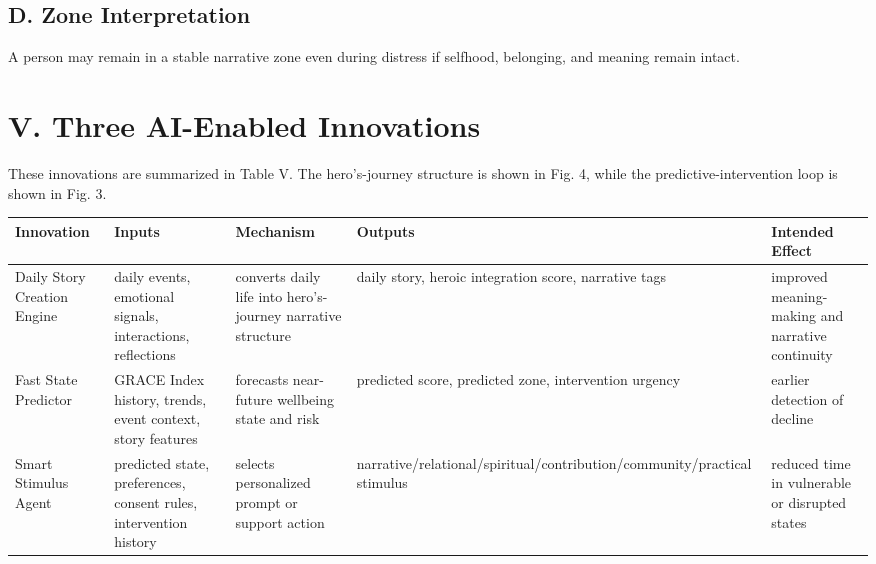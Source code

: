 \documentclass[
  journal,
]{IEEEtran}%
\newcounter{none} %
\begin{document}
\subsection{D. Zone Interpretation}\label{d.-zone-interpretation}

A person may remain in a stable narrative zone even during distress if
selfhood, belonging, and meaning remain intact.

\section{V. Three AI-Enabled
Innovations}\label{v.-three-ai-enabled-innovations}

These innovations are summarized in Table V. The hero's-journey
structure is shown in Fig. 4, while the predictive-intervention loop is
shown in Fig. 3.

{\def\LTcaptype{none} %
\begin{longtable}[]{@{}
  >{\raggedright\arraybackslash}p{}
  >{\raggedright\arraybackslash}p{}
  >{\raggedright\arraybackslash}p{}
  >{\raggedright\arraybackslash}p{}
  >{\raggedright\arraybackslash}p{}@{}}
\toprule\noalign{}
\begin{minipage}[b]{\linewidth}\raggedright
Innovation
\end{minipage} & \begin{minipage}[b]{\linewidth}\raggedright
Inputs
\end{minipage} & \begin{minipage}[b]{\linewidth}\raggedright
Mechanism
\end{minipage} & \begin{minipage}[b]{\linewidth}\raggedright
Outputs
\end{minipage} & \begin{minipage}[b]{\linewidth}\raggedright
Intended Effect
\end{minipage} \\
\midrule\noalign{}
\endhead
\bottomrule\noalign{}
\endlastfoot
Daily Story Creation Engine & daily events, emotional signals,
interactions, reflections & converts daily life into hero's-journey
narrative structure & daily story, heroic integration score, narrative
tags & improved meaning-making and narrative continuity \\
Fast State Predictor & GRACE Index history, trends, event context, story
features & forecasts near-future wellbeing state and risk & predicted
score, predicted zone, intervention urgency & earlier detection of
decline \\
Smart Stimulus Agent & predicted state, preferences, consent rules,
intervention history & selects personalized prompt or support action &
narrative/relational/spiritual/contribution/community/practical stimulus
& reduced time in vulnerable or disrupted states \\
\end{longtable}
}
\end{document}
